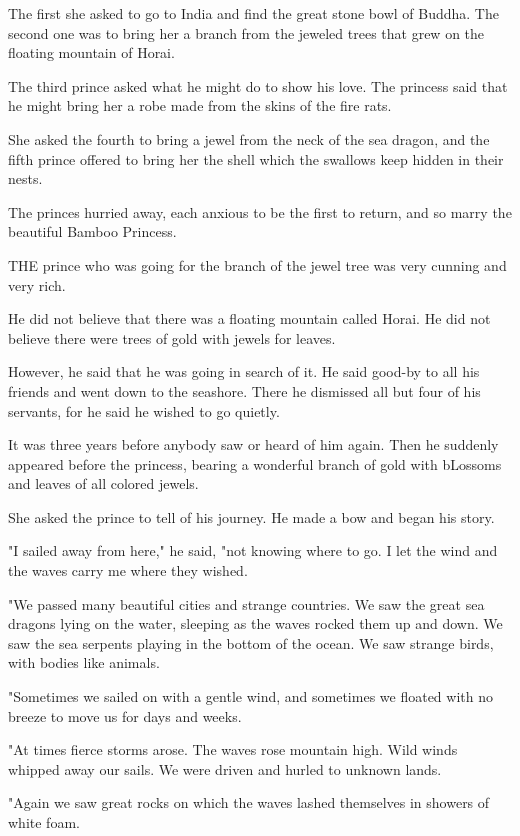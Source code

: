 \documentclass{article}
\begin{document}
The first she asked to go to India and find the great stone bowl of Buddha. The second one was to bring her a branch from the jeweled trees that grew on the floating mountain of Horai.

The third prince asked what he might do to show his love. The princess said that he might bring her a robe made from the skins of the fire rats.

She asked the fourth to bring a jewel from the neck of the sea dragon, and the fifth prince offered to bring her the shell which the swallows keep hidden in their nests.

The princes hurried away, each anxious to be the first to return, and so marry the beautiful Bamboo Princess.

THE prince who was going for the branch of the jewel tree was very cunning and very rich.

He did not believe that there was a floating mountain called Horai. He did not believe there were trees of gold with jewels for leaves.

However, he said that he was going in search of it. He said good-by to all his friends and went down to the seashore. There he dismissed all but four of his servants, for he said he wished to go quietly.

It was three years before anybody saw or heard of him again. Then he suddenly appeared before the princess, bearing a wonderful branch of gold with bLossoms and leaves of all colored jewels.

She asked the prince to tell of his journey. He made a bow and began his story.

"I sailed away from here," he said, "not knowing where to go. I let the wind and the waves carry me where they wished.

"We passed many beautiful cities and strange countries. We saw the great sea dragons lying on the water, sleeping as the waves rocked them up and down. We saw the sea serpents playing in the bottom of the ocean. We saw strange birds, with bodies like animals.

"Sometimes we sailed on with a gentle wind, and sometimes we floated with no breeze to move us for days and weeks.

"At times fierce storms arose. The waves rose mountain high. Wild winds whipped away our sails. We were driven and hurled to unknown lands.

"Again we saw great rocks on which the waves lashed themselves in showers of white foam.
\end{document}
